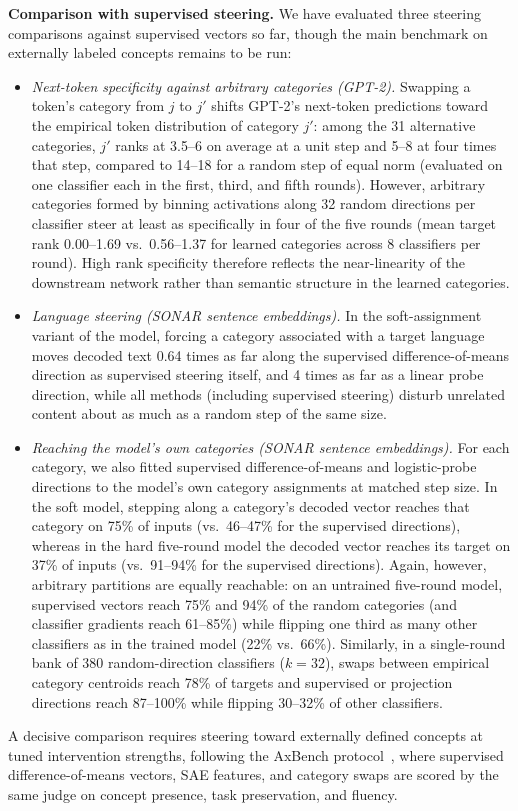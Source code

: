 \documentclass[11pt]{article}
\begin{document}
\textbf{Comparison with supervised steering.}
We have evaluated three steering comparisons against supervised vectors so
far, though the main benchmark on externally labeled concepts remains to
be run:
\begin{itemize}
\item \emph{Next-token specificity against arbitrary categories (GPT-2).}
Swapping a token's category from $j$ to $j'$ shifts GPT-2's next-token
predictions toward the empirical token distribution of category $j'$:
among the 31 alternative categories, $j'$ ranks at 3.5--6 on average at a
unit step and 5--8 at four times that step, compared to 14--18 for a
random step of equal norm (evaluated on one classifier each in the first,
third, and fifth rounds). However, arbitrary categories formed by binning
activations along 32 random directions per classifier steer at least as
specifically in four of the five rounds (mean target rank 0.00--1.69 vs.\
0.56--1.37 for learned categories across 8 classifiers per round). High
rank specificity therefore reflects the near-linearity of the downstream
network rather than semantic structure in the learned categories.
\item \emph{Language steering (SONAR sentence embeddings).} In the
soft-assignment variant of the model, forcing a category associated with a
target language moves decoded text 0.64 times as far along the supervised
difference-of-means direction as supervised steering itself, and 4 times
as far as a linear probe direction, while all methods (including
supervised steering) disturb unrelated content about as much as a random
step of the same size.
\item \emph{Reaching the model's own categories (SONAR sentence
embeddings).} For each category, we also fitted supervised
difference-of-means and logistic-probe directions to the model's own
category assignments at matched step size. In the soft model, stepping
along a category's decoded vector reaches that category on 75\% of inputs
(vs.\ 46--47\% for the supervised directions), whereas in the hard
five-round model the decoded vector reaches its target on 37\% of inputs
(vs.\ 91--94\% for the supervised directions). Again, however, arbitrary
partitions are equally reachable: on an untrained five-round model,
supervised vectors reach 75\% and 94\% of the random categories (and
classifier gradients reach 61--85\%) while flipping one third as many
other classifiers as in the trained model (22\% vs.\ 66\%). Similarly, in
a single-round bank of 380 random-direction classifiers ($k{=}32$), swaps
between empirical category centroids reach 78\% of targets and supervised
or projection directions reach 87--100\% while flipping 30--32\% of other
classifiers.
\end{itemize}
A decisive comparison requires steering toward externally defined concepts
at tuned intervention strengths, following the AxBench
protocol~\cite{wu2025axbenchsteeringllmssimple}, where supervised
difference-of-means vectors, SAE features, and category swaps are scored
by the same judge on concept presence, task preservation, and fluency.
\end{document}
